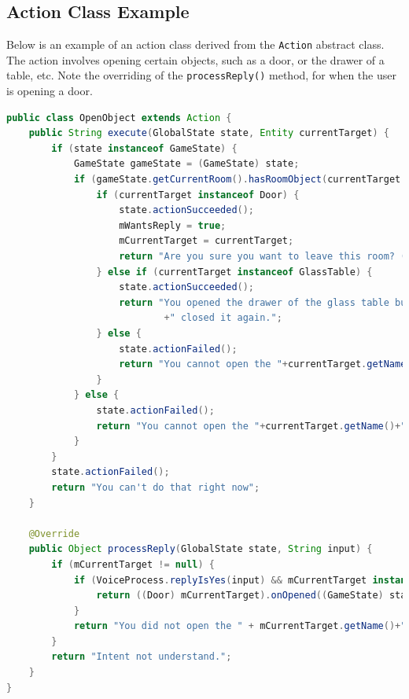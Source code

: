 \documentclass[11pt]{article}
\begin{document}
\newpage
\subsection{Action Class Example}
\label{appendix:open-object}

Below is an example of an action class derived from the \texttt{Action} abstract class. The action involves opening certain objects, such as a door, or the drawer of a table, etc. Note the overriding of the \texttt{processReply()} method, for when the user is opening a door.

\begin{lstlisting}[language=Java]
public class OpenObject extends Action {
    public String execute(GlobalState state, Entity currentTarget) {
        if (state instanceof GameState) {
            GameState gameState = (GameState) state;
            if (gameState.getCurrentRoom().hasRoomObject(currentTarget.getName())) {
                if (currentTarget instanceof Door) {
                    state.actionSucceeded();
                    mWantsReply = true;
                    mCurrentTarget = currentTarget;
                    return "Are you sure you want to leave this room? (yes/no)";
                } else if (currentTarget instanceof GlassTable) {
                    state.actionSucceeded();
                    return "You opened the drawer of the glass table but nothing is inside. You"
                            +" closed it again.";
                } else {
                    state.actionFailed();
                    return "You cannot open the "+currentTarget.getName()+".";
                }
            } else {
                state.actionFailed();
                return "You cannot open the "+currentTarget.getName()+".";
            }
        }
        state.actionFailed();
        return "You can't do that right now";
    }

    @Override
    public Object processReply(GlobalState state, String input) {
        if (mCurrentTarget != null) {
            if (VoiceProcess.replyIsYes(input) && mCurrentTarget instanceof Door) {
                return ((Door) mCurrentTarget).onOpened((GameState) state);
            }
            return "You did not open the " + mCurrentTarget.getName()+".";
        }
        return "Intent not understand.";
    }
}

\end{lstlisting}

\newpage
\end{document}
